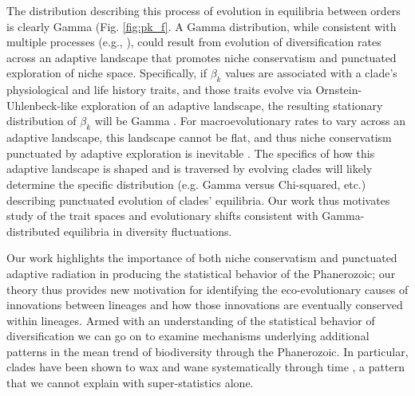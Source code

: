 \documentclass[12pt]{article}
\let\citep=\cite
\begin{document}
The distribution describing this process of evolution in equilibria
between orders is clearly Gamma (Fig. \ref{fig:pk_f}.  A Gamma
distribution, while consistent with multiple processes (e.g.,
\citep{cir1985}), could result from evolution of diversification rates
across an adaptive landscape that promotes niche conservatism and
punctuated exploration of niche space.  Specifically, if $\beta_k$
values are associated with a clade's physiological and life history
traits, and those traits evolve via Ornstein-Uhlenbeck-like
exploration of an adaptive landscape, the resulting stationary
distribution of $\beta_k$ will be Gamma \citep{cir1985, butler2004}.
For macroevolutionary rates to vary across an adaptive landscape, this
landscape cannot be flat, and thus niche conservatism punctuated by
adaptive exploration is inevitable \citep{newman1985adaptive}. The
specifics of how this adaptive landscape is shaped and is traversed by
evolving clades will likely determine the specific distribution
(e.g. Gamma versus Chi-squared, etc.) describing punctuated evolution
of clades' equilibria.  Our work thus motivates study of the trait
spaces and evolutionary shifts consistent with Gamma-distributed
equilibria in diversity fluctuations.

Our work highlights the importance of both niche conservatism and
punctuated adaptive radiation in producing the statistical behavior of
the Phanerozoic; our theory thus provides new motivation for
identifying the eco-evolutionary causes of innovations between
lineages and how those innovations are eventually conserved within
lineages. Armed with an understanding of the statistical behavior of
diversification we can go on to examine mechanisms underlying
additional patterns in the mean trend of biodiversity through the
Phanerozoic. In particular, clades have been shown to wax and wane
systematically through time \citep{liow2007,
  quental2013}, a pattern that we cannot explain with super-statistics
alone.
\end{document}
